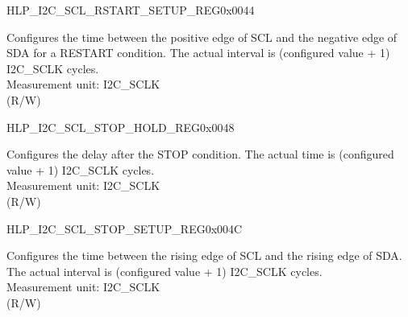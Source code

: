     
    \begin{register}{H}{LP\_I2C\_SCL\_RSTART\_SETUP\_REG}{0x0044}\label{regdesc:LPI2CSCLRSTARTSETUPREG}
    \regnewline%
    \begin{regdesc}\begin{reglist}
    \label{fielddesc:LPI2CSCLRSTARTSETUPTIME}\item [LP\_I2C\_SCL\_RSTART\_SETUP\_TIME] Configures the time between the positive edge of SCL and the negative edge of SDA for a RESTART condition. The actual interval is (configured value + 1) I2C\_SCLK cycles.\\
Measurement unit: I2C\_SCLK \\ (R/W)
    \end{reglist}\end{regdesc}
    \end{register}
    
    
    \begin{register}{H}{LP\_I2C\_SCL\_STOP\_HOLD\_REG}{0x0048}\label{regdesc:LPI2CSCLSTOPHOLDREG}
    \regnewline%
    \begin{regdesc}\begin{reglist}
    \label{fielddesc:LPI2CSCLSTOPHOLDTIME}\item [LP\_I2C\_SCL\_STOP\_HOLD\_TIME] Configures the delay after the STOP condition. The actual time is (configured value + 1) I2C\_SCLK cycles.\\
Measurement unit: I2C\_SCLK \\ (R/W)
    \end{reglist}\end{regdesc}
    \end{register}
    
    
    \begin{register}{H}{LP\_I2C\_SCL\_STOP\_SETUP\_REG}{0x004C}\label{regdesc:LPI2CSCLSTOPSETUPREG}
    \regnewline%
    \begin{regdesc}\begin{reglist}
    \label{fielddesc:LPI2CSCLSTOPSETUPTIME}\item [LP\_I2C\_SCL\_STOP\_SETUP\_TIME] Configures the time between the rising edge of SCL and the rising edge of SDA. The actual interval is (configured value + 1) I2C\_SCLK cycles.\\
Measurement unit: I2C\_SCLK \\ (R/W)
    \end{reglist}\end{regdesc}
    \end{register}
    
